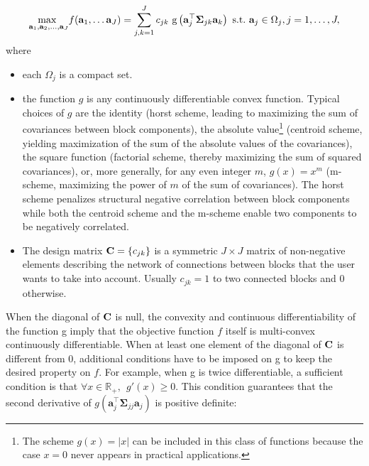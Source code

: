 \documentclass[
]{jss}
\begin{document}
\begin{equation}
\underset{\mathbf{a}_1, \mathbf{a}_2, \ldots,\mathbf{a}_J}{\text{max~}}  f(\mathbf{a}_1, \ldots \mathbf{a}_J) = \displaystyle  \sum_{j, k = 1}^J c_{jk} \text{
g}\left(\mathbf{a}_j^\top \mathbf{\Sigma}_{jk} \mathbf{a}_k\right)\\
\mathrm{~s.t.~} \mathbf{a}_j \in \Omega_j, j =1, \ldots, J,
\label{opti_theo}
\end{equation} where

\begin{itemize}
\item each $\Omega_j$ is a compact set.

\item the function $g$ is any continuously differentiable convex function. 
Typical choices of $g$ are the identity (horst scheme, leading to maximizing 
the sum of covariances between block components), the absolute 
value\footnote{The scheme $g(x) = \vert x \vert$ can be included in this class 
of functions because the case $x=0$ never appears in practical applications.} 
(centroid scheme, yielding maximization of the sum of the absolute values of 
the covariances), the square function (factorial scheme, thereby maximizing the 
sum of squared covariances), or, more generally, for any even integer $m$, 
$g(x) = x^m$ (m-scheme, maximizing the power of $m$ of the sum of covariances). 
The horst scheme penalizes structural negative correlation between block 
components while both the centroid scheme and the m-scheme enable two 
components to be negatively correlated. 

\item The design matrix $\mathbf{C} = \lbrace c_{jk}\rbrace$ is a symmetric 
$J \times J$ matrix of non-negative elements describing the network of 
connections between blocks that the user wants to take into account. 
Usually $c_{jk} = 1$ to two connected blocks and $0$ otherwise. 
\end{itemize}

When the diagonal of \(\mathbf{C}\) is null, the convexity and continuous
differentiability of the function g imply that the objective function
\(f\) itself is multi-convex continuously differentiable. When at least
one element of the diagonal of \(\mathbf{C}\) is different from \(0\),
additional conditions have to be imposed on g to keep the desired
property on \(f\). For example, when g is twice differentiable, a
sufficient condition is that
\(\forall x\in\mathbb{R}_+, ~~g'(x)\geq 0\). This condition guarantees
that the second derivative of
\(g\left(\mathbf{a}_j^\top \mathbf{\Sigma}_{jj} \mathbf{a}_j\right)\) is
positive definite:
\end{document}
